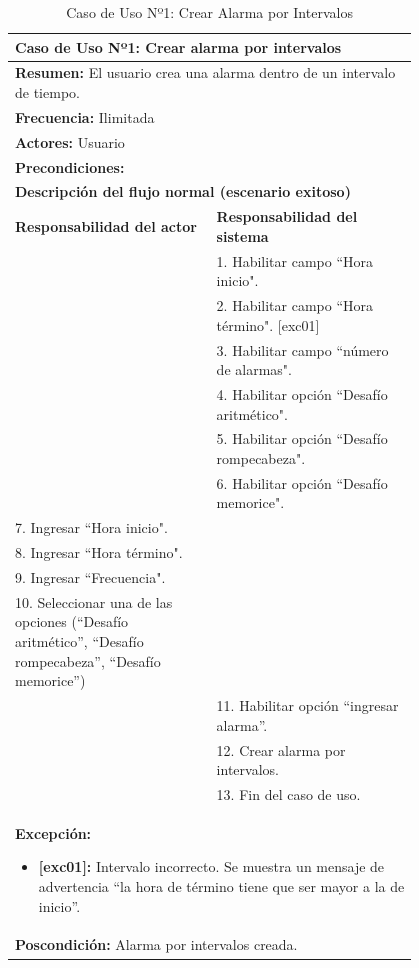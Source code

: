 \begin{table}[H]
    \centering
    \caption{Caso de Uso Nº1: Crear Alarma por Intervalos}
    \begin{tabular}{| p{0.4\linewidth} | p{0.4\linewidth} |}
        \hline
        \multicolumn{2}{|l|}{\textbf{Caso de Uso Nº1:}  Crear alarma por intervalos} \\
        \hline
        \multicolumn{2}{|l|}{\textbf{Resumen:}  El usuario crea una alarma dentro de un intervalo de tiempo.} \\
        \hline
        \multicolumn{2}{|l|}{\textbf{Frecuencia:}  Ilimitada} \\
        \hline
        \multicolumn{2}{|l|}{\textbf{Actores:}  Usuario} \\
        \hline
        \multicolumn{2}{|l|}{\textbf{Precondiciones:}} \\
        \hline
        \multicolumn{2}{|l|}{\textbf{Descripción del flujo normal (escenario exitoso)} } \\
        \hline
        \textbf{Responsabilidad del actor} & \textbf{Responsabilidad del sistema}\\
            & 1. Habilitar campo ``Hora inicio".\\
            & 2. Habilitar campo ``Hora término". [exc01]\\
            & 3. Habilitar campo ``número de alarmas". \\
            & 4. Habilitar opción ``Desafío aritmético".\\
            & 5. Habilitar opción ``Desafío rompecabeza".\\
            & 6. Habilitar opción ``Desafío memorice".\\
        7. Ingresar ``Hora inicio". &\\
        8. Ingresar ``Hora término". &\\
        9. Ingresar ``Frecuencia". &\\
        10. Seleccionar una de las opciones (“Desafío aritmético”, “Desafío rompecabeza”, “Desafío memorice”) &\\
            & 11. Habilitar opción ``ingresar alarma''.\\
            & 12. Crear alarma por intervalos.\\
            & 13. Fin del caso de uso. \\
        \hline
        \multicolumn{2}{|p{0.8\linewidth}|}{
            \textbf{Excepción:}
            \begin{itemize}
                \item \textbf{[exc01]:} Intervalo incorrecto. Se muestra un mensaje de advertencia “la hora de término tiene que ser mayor a la de inicio”.
            \end{itemize}}\\  
        \hline
        \multicolumn{2}{|l|}{\textbf{Poscondición:}  Alarma por intervalos creada.} \\
        \hline
    
    \end{tabular}    
    
    \label{table:1}
\end{table}

